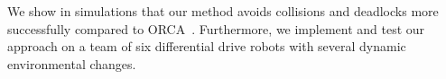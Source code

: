 \documentclass{svproc}
\newcommand{\vp}{\mathbf{p}}
\newcommand{\valpha}{\mathbf{\alpha}}
\newcommand{\vP}{\mathbf{P}}
\newcommand{\vf}{\mathbf{f}}
\newcommand{\vo}{\mathbf{o}}
\newcommand{\cV}{\mathcal{V}}
\newcommand{\cS}{\mathcal{S}}
\newcommand{\cO}{\mathcal{O}}
\newcommand{\cH}{\mathcal{H}}
\renewcommand{\th}{^{\text{th}}}
\newcommand{\todo}[1]{\textbf{\textcolor{red}{TODO: #1}}}
\begin{document}
We show in simulations that our method avoids collisions and deadlocks more successfully compared to ORCA~\cite{orca}.
Furthermore, we implement and test our approach on a team of six differential drive robots with several dynamic environmental changes.


\end{document}
